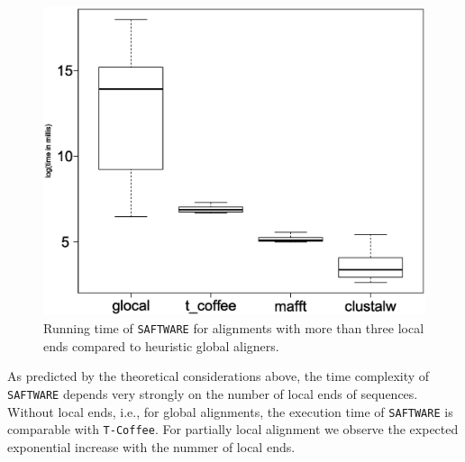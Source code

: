 \documentclass[a4paper,10pt]{article}
\newcommand{\TODO}[1]{\begingroup\color{red}#1\endgroup}
\newcommand{\SAFTWARE}{\TODO{\texttt{SAFTWARE}}}
\begin{document}
{\begin{figure}
  \begin{center}
    \includegraphics[width=1\columnwidth]{times_bigger3_boxplot.eps}
  \end{center}
  \caption{Running time of \SAFTWARE{} for alignments with more than three
    local ends compared to heuristic global aligners.}
  \label{fig:manyLoc}
\end{figure}

As predicted by the theoretical considerations above, the time complexity
of \SAFTWARE{} depends very strongly on the number of local ends of
sequences.  Without local ends, i.e., for global alignments, the execution
time of \SAFTWARE{} is comparable with \texttt{T-Coffee}. For partially
local alignment we observe the expected exponential increase with the
nummer of local ends. 

}
\end{document}
